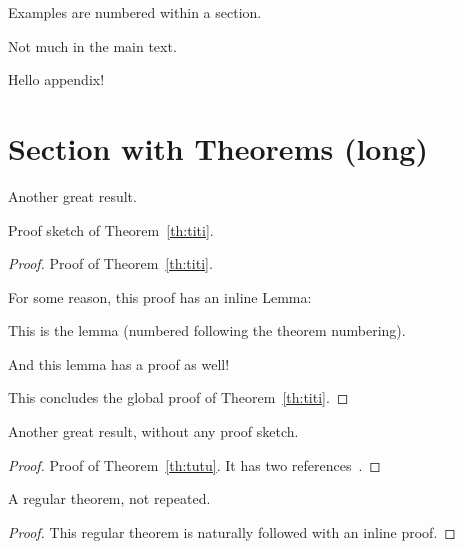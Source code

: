 \begin{apxexample}
  Examples are numbered within a section.
\end{apxexample}

Not much in the main text.

\begin{toappendix}
  Hello appendix!
\end{toappendix}

\section[Section with Theorems (short)]%
        {Section with Theorems (long)}

\begin{theoremrep}
  \label{th:titi}%
  Another great result.
\end{theoremrep}

\begin{proofsketch}
  Proof sketch of Theorem~\ref{th:titi}.
\end{proofsketch}

\begin{proof}
  Proof of Theorem~\ref{th:titi}.

  For some reason, this proof has an inline Lemma:
  \begin{lemma}
    This is the lemma (numbered following the theorem numbering).
  \end{lemma} 

  \begin{nestedproof}
    And this lemma has a proof as well!
  \end{nestedproof}

  This concludes the global proof of Theorem~\ref{th:titi}.
\end{proof}

\begin{theoremrep}
  \label{th:tutu}%
  Another great result, without any proof sketch.
\end{theoremrep}

\begin{proof}
  Proof of Theorem~\ref{th:tutu}. It has two
  references~\cite{sitemaps,brin1998anatomy}.
\end{proof}

\begin{theorem}
  A regular theorem, not repeated.
\end{theorem}

\begin{proof}
This regular theorem is naturally followed with an inline proof.
\end{proof}


